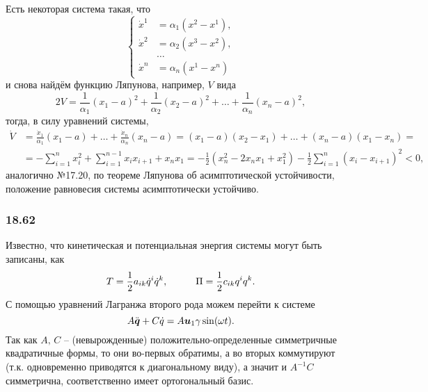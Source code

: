 Есть некоторая система такая, что
\begin{equation*}
    \left\{\begin{aligned}
        \dot{x}^1 &= \alpha_1 (x^2 - x^1), \\
        \dot{x}^2 &= \alpha_2 (x^3 - x^2), \\
        &\ldots\\
        \dot{x}^n &= \alpha_n (x^1 - x^n)
    \end{aligned}\right.
\end{equation*}
и снова найдём функцию Ляпунова, например, $V$ вида
\begin{equation*}
    2 V = \frac{1}{\alpha_1}(x_1 - a)^2 + \frac{1}{\alpha_2} (x_2 - a)^2 + \ldots + \frac{1}{\alpha_n}(x_n - a)^2,
\end{equation*}
тогда, в силу уравнений системы,
\begin{align*}
    \dot{V} &= \frac{\dot{x}_1}{\alpha_1} (x_1 - a) + \ldots + 
    \frac{\dot{x}_n}{\alpha_n}(x_n - a) = 
    (x_1 - a) (x_2 - x_1) + \ldots + (x_n - a) (x_1 - x_n) = \\
    &= - \sum_{i=1}^{n} x_i^2 + 
    \sum_{i=1}^{n-1} x_i x_{i+1} + x_n x_1 = 
    - \frac{1}{2}(x_n^2 - 2 x_n x_1 + x_1^2) - \frac{1}{2} 
    \sum_{i=1}^{n} (x_i - x_{i+1})^2 < 0,
\end{align*}
аналогично №17.20,
по теореме Ляпунова об асимптотической устойчивости,
положение равновесия системы асимптотически устойчиво.













\subsubsection*{18.62}
Известно, что кинетическая и потенциальная энергия системы могут быть записаны, как
\begin{equation*}
    T = \frac{1}{2} a_{ik} \dot{q}^i \dot{q}^k,
    \hspace{1 cm}
    \Pi = \frac{1}{2} c_{ik} q^i q^k.
\end{equation*}
С помощью уравнений Лагранжа второго рода можем перейти  к системе
\begin{equation*}
    A \ddot{\mbox{\boldmath $q$}} + C \dot{q} = A \mbox{\boldmath $u$}_1 \gamma \sin (\omega t).
\end{equation*}
Так как $A, \,C$ -- (невырожденные) положительно-определенные симметричные квадратичные формы, то они во-первых обратимы, а во вторых коммутируют (т.к. одновременно приводятся к диагональному виду), а значит и $A^{-1} C$ симметрична, соответственно имеет ортогональный базис.

